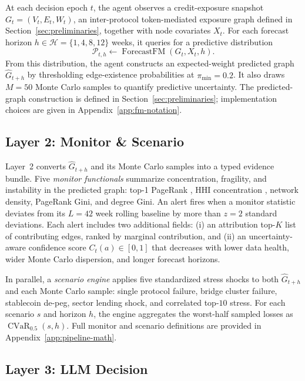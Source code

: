 At each decision epoch $t$, the agent observes a credit-exposure snapshot
$G_t=(V_t,E_t,W_t)$, an inter-protocol token-mediated exposure graph defined
in Section~\ref{sec:preliminaries}, together with node covariates $X_t$. For
each forecast horizon $h\in\mathcal{H}=\{1,4,8,12\}$ weeks, it queries
\fmname{} for a predictive distribution
\begin{equation}
\mathcal{P}_{t,h}
\leftarrow
\operatorname{ForecastFM}(G_t,X_t,h).
\end{equation}
From this distribution, the agent constructs an expected-weight predicted
graph $\widehat{G}_{t+h}$ by thresholding edge-existence probabilities at
$\pi_{\min}=0.2$. It also draws $M=50$ Monte Carlo samples to quantify
predictive uncertainty. The predicted-graph construction is defined in
Section~\ref{sec:preliminaries}; implementation choices are given in
Appendix~\ref{app:fm-notation}.

\subsection{Layer 2: Monitor \& Scenario}
\label{ssec:evidence}

Layer~2 converts $\widehat{G}_{t+h}$ and its Monte Carlo samples into a typed
evidence bundle. Five \emph{monitor functionals} summarize concentration,
fragility, and instability in the predicted graph: top-1 PageRank
\citep{BrinPage1998PageRank}, HHI concentration
\citep{Rhoades1993HHI}, network density, PageRank Gini, and degree Gini. An
alert fires when a monitor statistic deviates from its $L=42$ week rolling
baseline by more than $z=2$ standard deviations. Each alert includes two
additional fields: (i) an attribution top-$K$ list of contributing edges,
ranked by marginal contribution, and (ii) an uncertainty-aware confidence
score $C_t(a)\in[0,1]$ that decreases with lower data health, wider Monte
Carlo dispersion, and longer forecast horizons.

In parallel, a \emph{scenario engine} applies five standardized stress
shocks to both $\widehat{G}_{t+h}$ and each Monte Carlo sample: single
protocol failure, bridge cluster failure, stablecoin de-peg, sector lending
shock, and correlated top-$10$ stress. For each scenario $s$ and horizon
$h$, the engine aggregates the worst-half sampled losses as
$\operatorname{CVaR}_{0.5}(s,h)$. Full monitor and scenario definitions are
provided in Appendix~\ref{app:pipeline-math}.

\subsection{Layer 3: LLM Decision}
\label{ssec:llm-decision}

